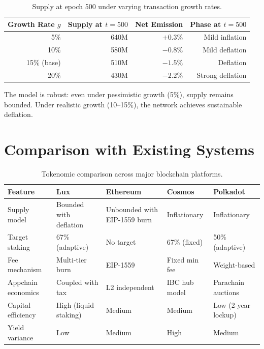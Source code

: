 \documentclass[11pt,a4paper]{article}
\begin{document}
\begin{table}[H]
\centering
\caption{Supply at epoch 500 under varying transaction growth rates.}
\label{tab:sensitivity}
\begin{tabular}{rrrr}
\toprule
\textbf{Growth Rate $g$} & \textbf{Supply at $t=500$} & \textbf{Net Emission} & \textbf{Phase at $t=500$} \\
\midrule
5\% & 640M & $+0.3\%$ & Mild inflation \\
10\% & 580M & $-0.8\%$ & Mild deflation \\
15\% (base) & 510M & $-1.5\%$ & Deflation \\
20\% & 430M & $-2.2\%$ & Strong deflation \\
\bottomrule
\end{tabular}
\end{table}

The model is robust: even under pessimistic growth (5\%), supply remains bounded. Under realistic growth (10--15\%), the network achieves sustainable deflation.

\section{Comparison with Existing Systems}\label{sec:comparison}

\begin{table}[H]
\centering
\caption{Tokenomic comparison across major blockchain platforms.}
\label{tab:comparison}
\begin{tabular}{p{3cm}p{2.5cm}p{2.5cm}p{2.5cm}p{2.5cm}}
\toprule
\textbf{Feature} & \textbf{Lux} & \textbf{Ethereum} & \textbf{Cosmos} & \textbf{Polkadot} \\
\midrule
Supply model & Bounded with deflation & Unbounded with EIP-1559 burn & Inflationary & Inflationary \\
Target staking & 67\% (adaptive) & No target & 67\% (fixed) & 50\% (adaptive) \\
Fee mechanism & Multi-tier burn & EIP-1559 & Fixed min fee & Weight-based \\
Appchain economics & Coupled with tax & L2 independent & IBC hub model & Parachain auctions \\
Capital efficiency & High (liquid staking) & Medium & Medium & Low (2-year lockup) \\
Yield variance & Low & Medium & High & Medium \\
\bottomrule
\end{tabular}
\end{table}
\end{document}
